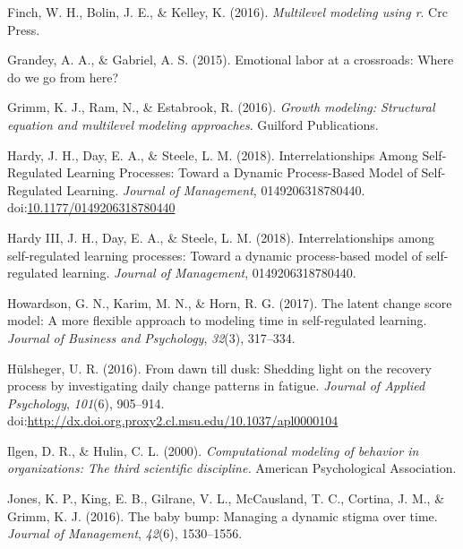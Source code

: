 \documentclass[english,,man]{apa6}
\begin{document}
\leavevmode\hypertarget{ref-finch2016multilevel}{}%
Finch, W. H., Bolin, J. E., \& Kelley, K. (2016). \emph{Multilevel modeling using r}. Crc Press.

\leavevmode\hypertarget{ref-grandey2015emotional}{}%
Grandey, A. A., \& Gabriel, A. S. (2015). Emotional labor at a crossroads: Where do we go from here?

\leavevmode\hypertarget{ref-grimm_growth_2016}{}%
Grimm, K. J., Ram, N., \& Estabrook, R. (2016). \emph{Growth modeling: Structural equation and multilevel modeling approaches}. Guilford Publications.

\leavevmode\hypertarget{ref-hardy_interrelationships_2018}{}%
Hardy, J. H., Day, E. A., \& Steele, L. M. (2018). Interrelationships Among Self-Regulated Learning Processes: Toward a Dynamic Process-Based Model of Self-Regulated Learning. \emph{Journal of Management}, 0149206318780440. doi:\href{https://doi.org/10.1177/0149206318780440}{10.1177/0149206318780440}

\leavevmode\hypertarget{ref-hardy2018}{}%
Hardy III, J. H., Day, E. A., \& Steele, L. M. (2018). Interrelationships among self-regulated learning processes: Toward a dynamic process-based model of self-regulated learning. \emph{Journal of Management}, 0149206318780440.

\leavevmode\hypertarget{ref-howardson2017latent}{}%
Howardson, G. N., Karim, M. N., \& Horn, R. G. (2017). The latent change score model: A more flexible approach to modeling time in self-regulated learning. \emph{Journal of Business and Psychology}, \emph{32}(3), 317--334.

\leavevmode\hypertarget{ref-hulsheger_dawn_2016}{}%
Hülsheger, U. R. (2016). From dawn till dusk: Shedding light on the recovery process by investigating daily change patterns in fatigue. \emph{Journal of Applied Psychology}, \emph{101}(6), 905--914. doi:\href{https://doi.org/http://dx.doi.org.proxy2.cl.msu.edu/10.1037/apl0000104}{http://dx.doi.org.proxy2.cl.msu.edu/10.1037/apl0000104}

\leavevmode\hypertarget{ref-ilgen_computational_2000}{}%
Ilgen, D. R., \& Hulin, C. L. (2000). \emph{Computational modeling of behavior in organizations: The third scientific discipline.} American Psychological Association.

\leavevmode\hypertarget{ref-jones_baby_2016}{}%
Jones, K. P., King, E. B., Gilrane, V. L., McCausland, T. C., Cortina, J. M., \& Grimm, K. J. (2016). The baby bump: Managing a dynamic stigma over time. \emph{Journal of Management}, \emph{42}(6), 1530--1556.
\end{document}
